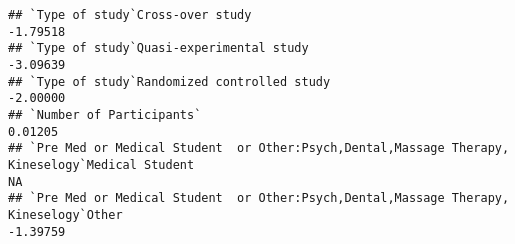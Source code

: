 \documentclass[]{article}
\begin{document}
\begin{verbatim}
## `Type of study`Cross-over study                                                                                                                                                                                                                                                                                                                                                                                                                                                 -1.79518
## `Type of study`Quasi-experimental study                                                                                                                                                                                                                                                                                                                                                                                                                                         -3.09639
## `Type of study`Randomized controlled study                                                                                                                                                                                                                                                                                                                                                                                                                                      -2.00000
## `Number of Participants`                                                                                                                                                                                                                                                                                                                                                                                                                                                         0.01205
## `Pre Med or Medical Student  or Other:Psych,Dental,Massage Therapy, Kineselogy`Medical Student                                                                                                                                                                                                                                                                                                                                                                                        NA
## `Pre Med or Medical Student  or Other:Psych,Dental,Massage Therapy, Kineselogy`Other                                                                                                                                                                                                                                                                                                                                                                                            -1.39759

\end{verbatim}
\end{document}
